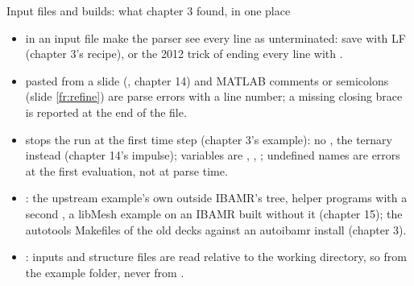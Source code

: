 \documentclass[aspectratio=169,11pt]{beamer}
\begin{document}
\begin{frame}{Input files and builds: what chapter 3 found, in one place}
\label{fr:parse}
\footnotesize
\begin{itemize}
  \item {} in an input file make the parser see every line as unterminated: save with LF (chapter 3's recipe), or the 2012 trick of ending every line with \code{//}.
  \item {} pasted from a slide (, chapter 14) and MATLAB \code{\%} comments or semicolons (slide \ref{fr:refine}) are parse errors with a line number; a missing closing brace is reported at the end of the file.
  \item {} stops the run at the first time step (chapter 3's example): no , the ternary  instead (chapter 14's impulse); variables are , , ; undefined names are errors at the first evaluation, not at parse time.
  \item {}: the upstream example's own  outside IBAMR's tree, helper programs with a second , a libMesh example on an IBAMR built without it (chapter 15); the autotools Makefiles of the old decks against an autoibamr install (chapter 3).
  \item {}: inputs and structure files are read relative to the working directory, so  from the example folder, never from .
\end{itemize}
\end{frame}
\end{document}
